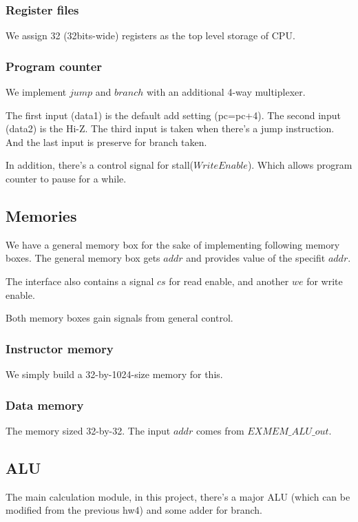 \documentclass[11pt, a4paper]{article}
\begin{document}
\subsubsection{Register files}
We assign 32 (32bits-wide) registers as the top level storage of CPU.

\subsubsection{Program counter}
\par We implement $jump$ and $branch$ with an additional 4-way multiplexer.
\par The first input (data1) is the default add setting (pc=pc+4). The second input (data2) is the Hi-Z. The third input is taken when there's a jump instruction. And the last input is preserve for branch taken.
\par In addition, there's a control signal for stall($WriteEnable$). Which allows program counter to pause for a while.

\subsection{Memories}
\par We have a general memory box for the sake of implementing following memory boxes. The general memory box gets $addr$ and provides value of the specifit $addr$.
\par The interface also contains a signal $cs$ for read enable, and another $we$ for write enable.
\par Both memory boxes gain signals from general control.
\subsubsection{Instructor memory}
We simply build a 32-by-1024-size memory for this. 

\subsubsection{Data memory}
The memory sized 32-by-32. The input $addr$ comes from $EXMEM\_ALU\_out$.

\subsection{ALU}
The main calculation module, in this project, there's a major ALU (which can be modified from the previous hw4) and some adder for branch.
\end{document}
